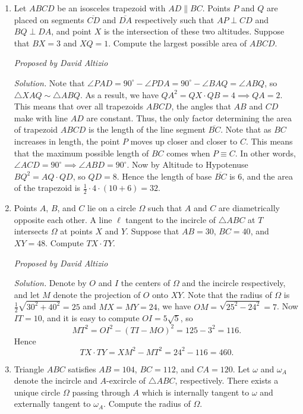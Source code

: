 \documentclass[10pt]{article}
\newcounter{enum}
\newcommand{\proposed}[1]
{
\vspace{5pt}
\noindent\textit{Proposed by #1}
}
\newcommand{\solution}
{
\vspace{5pt}
\noindent\textit{Solution.}\qquad
}
\begin{document}
\begin{enumerate}

\item Let $ABCD$ be an isosceles trapezoid with $AD\parallel BC$.  Points $P$ and $Q$ are placed on segments $\overline{CD}$ and $\overline{DA}$ respectively such that $AP\perp CD$ and $BQ\perp DA$, and point $X$ is the intersection of these two altitudes.  Suppose that $BX=3$ and $XQ=1$.  Compute the largest possible area of $ABCD$.

\proposed{David Altizio}

\solution Note that $\angle PAD = 90^\circ-\angle PDA = 90^\circ - \angle BAQ = \angle ABQ$, so $\triangle XAQ\sim\triangle ABQ$.  As a result, we have $QA^2 = QX\cdot QB = 4\implies QA = 2$.  This means that over all trapezoids $ABCD$, the angles that $AB$ and $CD$ make with line $AD$ are constant.  Thus, the only factor determining the area of trapezoid $ABCD$ is the length of the line segment $\overline{BC}$.  Note that as $BC$ increases in length, the point $P$ moves up closer and closer to $C$.  This means that the maximum possible length of $BC$ comes when $P\equiv C$.  In other words, $\angle ACD=90^\circ\implies \angle ABD=90^\circ$.  Now by Altitude to Hypotenuse $BQ^2 = AQ\cdot QD$, so $QD=8$.  Hence the length of base $\overline{BC}$ is $6$, and the area of the trapezoid is $\tfrac12\cdot 4\cdot (10+6) = \boxed{32}$.

\item Points $A$, $B$, and $C$ lie on a circle $\Omega$ such that $A$ and $C$ are diametrically opposite each other.  A line $\ell$ tangent to the incircle of $\triangle ABC$ at $T$ intersects $\Omega$ at points $X$ and $Y$.  Suppose that $AB=30$, $BC=40$, and $XY=48$.  Compute $TX\cdot TY$.

\proposed{David Altizio}

\solution Denote by $O$ and $I$ the centers of $\Omega$ and the incircle respectively, and let $M$ denote the projection of $O$ onto $XY$.  Note that the radius of $\Omega$ is $\tfrac12\sqrt{30^2+40^2} = 25$ and $MX=MY=24$, we have $OM = \sqrt{25^2-24^2} = 7$.  Now $IT=10$, and it is easy to compute $OI=5\sqrt 5$, so \[MT^2 = OI^2 - (TI-MO)^2 = 125 - 3^2 = 116.\] Hence \[TX\cdot TY = XM^2 - MT^2 = 24^2 - 116 = \boxed{460}.\]

\item Triangle $ABC$ satisfies $AB=104$, $BC=112$, and $CA=120$.  Let $\omega$ and $\omega_A$ denote the incircle and $A$-excircle of $\triangle ABC$, respectively.  There exists a unique circle $\Omega$ passing through $A$ which is internally tangent to $\omega$ and externally tangent to $\omega_A$.  Compute the radius of $\Omega$.


\end{enumerate}
\end{document}
